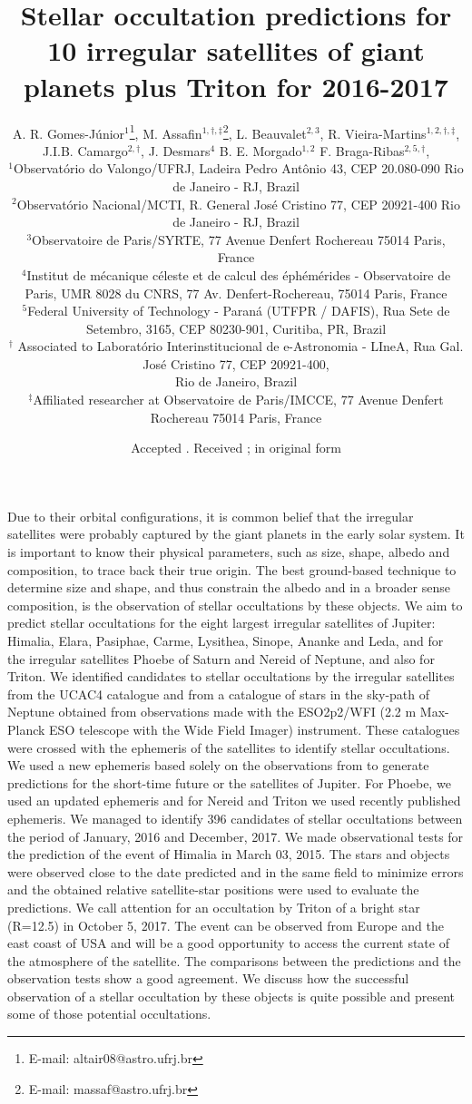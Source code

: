 \documentclass[useAMS,usenatbib]{mn2e}
\title[Predictions of Stellar Occulations by irregular satellites]{Stellar occultation predictions for 10 irregular satellites of giant planets plus Triton for 2016-2017}
\author[A. R. Gomes-Júnior, M. Assafin, L. Beauvalet et al.]{
A. R. Gomes-Júnior$^{1}$\thanks{E-mail: altair08@astro.ufrj.br},
M. Assafin$^{1,\dag,\ddag}$\thanks{E-mail: massaf@astro.ufrj.br},
L. Beauvalet$^{2,3}$,
R. Vieira-Martins$^{1,2,\dag,\ddag}$,
J.I.B. Camargo$^{2,\dag}$,
J. Desmars$^{4}$
B. E. Morgado$^{1,2}$
F. Braga-Ribas$^{2, 5, \dag}$,
\\
$^{1}$Observat\'orio do Valongo/UFRJ, Ladeira Pedro Ant\^onio 43,
CEP 20.080-090 Rio de Janeiro - RJ, Brazil\\
$^{2}$Observat\'orio Nacional/MCTI, R. General Jos\'e Cristino 77, CEP 20921-400 Rio de Janeiro - RJ, Brazil\\
$^{3}$Observatoire de Paris/SYRTE, 77 Avenue Denfert Rochereau 75014 Paris, France\\
$^{4}$Institut de mécanique céleste et de calcul des éphémérides - Observatoire de Paris, UMR 8028 du CNRS,
77 Av. Denfert-Rochereau, 75014 Paris, France\\
$^{5}$Federal University of Technology - Paran\'a (UTFPR / DAFIS), Rua Sete de Setembro, 3165, CEP 80230-901, Curitiba, PR, Brazil\\
$^\dag$ Associated to Laborat\'{o}rio Interinstitucional de e-Astronomia - LIneA, Rua Gal. Jos\'e Cristino 77, CEP 20921-400,\\ Rio de Janeiro, Brazil\\
$^\ddag$Affiliated researcher at Observatoire de Paris/IMCCE, 77 Avenue Denfert Rochereau 75014 Paris, France
}
\begin{document}
\date{Accepted . Received ; in original form }

\pagerange{\pageref{firstpage}--\pageref{lastpage}} 

\maketitle

\label{firstpage}

\abstract
Due to their orbital configurations, it is common belief that the irregular satellites were probably captured by the giant planets in the early solar system. It is important to know their physical parameters, such as size, shape, albedo and composition, to trace back their true origin. The best ground-based technique to determine size and shape, and thus constrain the albedo and in a broader sense composition, is the observation of stellar occultations by these objects.
We aim to predict stellar occultations for the eight largest irregular satellites of Jupiter: Himalia, Elara, Pasiphae, Carme, Lysithea, Sinope, Ananke and Leda, and for the irregular satellites Phoebe of Saturn and Nereid of Neptune, and also for Triton.
We identified candidates to stellar occultations by the irregular satellites from the UCAC4 catalogue and from a catalogue of stars in the sky-path of Neptune obtained from observations made with the ESO2p2/WFI (2.2 m Max-Planck ESO telescope with the Wide Field Imager) instrument. These catalogues were crossed with the ephemeris of the satellites to identify stellar occultations. We used a new ephemeris based solely on the observations from \cite{GomesJunior2015} to generate predictions for the short-time future or the satellites of Jupiter. For Phoebe, we used an updated ephemeris and for Nereid and Triton we used recently published ephemeris.
We managed to identify 396 candidates of stellar occultations between the period of January, 2016 and December, 2017. We made observational tests for the prediction of the event of Himalia in March 03, 2015. The stars and objects were observed close to the date predicted and in the same field to minimize errors and the obtained relative satellite-star positions were used to evaluate the predictions. We call attention for an occultation by Triton of a bright star (R=12.5) in October 5, 2017. The event can be observed from Europe and the east coast of USA and will be a good opportunity to access the current state of the atmosphere of the satellite.
The comparisons between the predictions and the observation tests show a good agreement. We discuss how the successful observation of a stellar occultation by these objects is quite possible and present some of those potential occultations.
\end{document}
